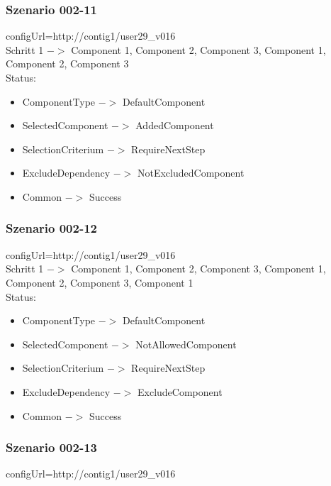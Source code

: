 \documentclass{article}
\begin{document}
\subsubsection{Szenario 002-11}

configUrl=http://contig1/user29\_v016\\

\noindent Schritt 1 $->$ Component 1, Component 2, Component 3, Component 1,
Component 2, Component 3\\

\noindent Status:

\begin{itemize}
  \item ComponentType $->$ DefaultComponent
  \item SelectedComponent $->$ AddedComponent
  \item SelectionCriterium $->$ RequireNextStep
  \item ExcludeDependency $->$ NotExcludedComponent
  \item Common $->$ Success
\end{itemize}

\subsubsection{Szenario 002-12}

configUrl=http://contig1/user29\_v016\\

\noindent Schritt 1 $->$ Component 1, Component 2, Component 3, Component 1,
Component 2, Component 3, Component 1\\

\noindent Status:

\begin{itemize}
  \item ComponentType $->$ DefaultComponent
  \item SelectedComponent $->$ NotAllowedComponent
  \item SelectionCriterium $->$ RequireNextStep
  \item ExcludeDependency $->$ ExcludeComponent
  \item Common $->$ Success
\end{itemize}

\subsubsection{Szenario 002-13}

configUrl=http://contig1/user29\_v016\\
\end{document}

